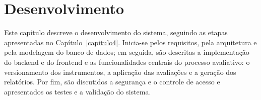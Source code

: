 \chapter[Desenvolvimento]{Desenvolvimento}\label{capitulo5}

Este capítulo descreve o desenvolvimento do sistema, seguindo as etapas apresentadas no Capítulo~\ref{capitulo4}. Inicia-se pelos requisitos, pela arquitetura e pela modelagem do banco de dados; em seguida, são descritas a implementação do backend e do frontend e as funcionalidades centrais do processo avaliativo: o versionamento dos instrumentos, a aplicação das avaliações e a geração dos relatórios. Por fim, são discutidos a segurança e o controle de acesso e apresentados os testes e a validação do sistema.
